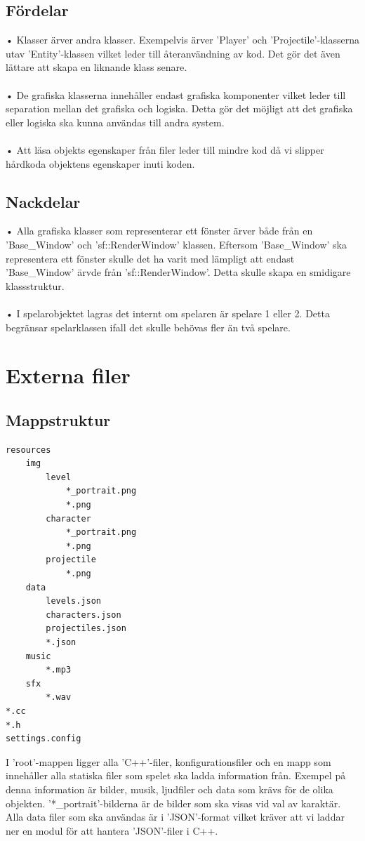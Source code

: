 \documentclass{TDP003mall}
\begin{document}
\subsection{Fördelar}
• Klasser ärver andra klasser. Exempelvis ärver 'Player' och 'Projectile'-klasserna utav 'Entity'-klassen vilket leder till återanvändning av kod. Det gör det även lättare att skapa en liknande klass senare.
\\ \\
• De grafiska klasserna innehåller endast grafiska komponenter vilket leder till separation mellan det grafiska och logiska. Detta gör det möjligt att det grafiska eller logiska ska kunna användas till andra system.
\\ \\
• Att läsa objekts egenskaper från filer leder till mindre kod då vi slipper hårdkoda objektens egenskaper inuti koden.
\subsection{Nackdelar}
• Alla grafiska klasser som representerar ett fönster ärver både från en 'Base\_Window' och 'sf::RenderWindow' klassen. Eftersom 'Base\_Window' ska representera ett fönster skulle det ha varit med lämpligt att endast 'Base\_Window' ärvde från 'sf::RenderWindow'. Detta skulle skapa en smidigare klassstruktur.
\\ \\
• I spelarobjektet lagras det internt om spelaren är spelare 1 eller 2. Detta begränsar spelarklassen ifall det skulle behövas fler än två spelare.

\newpage

\section{Externa filer}
\subsection{Mappstruktur}
\begin{lstlisting}[backgroundcolor = \color{lightgray}]
resources
    img
        level
            *_portrait.png
            *.png
        character
            *_portrait.png
            *.png
        projectile
            *.png
    data
        levels.json
        characters.json
        projectiles.json
        *.json
    music
        *.mp3
    sfx
        *.wav
*.cc
*.h
settings.config
\end{lstlisting}
I 'root'-mappen ligger alla 'C++'-filer, konfigurationsfiler och en mapp som innehåller alla statiska filer som spelet ska ladda information från. Exempel på denna information är bilder, musik, ljudfiler och data som krävs för de olika objekten. '*\_portrait'-bilderna är de bilder som ska visas vid val av karaktär. Alla data filer som ska användas är i 'JSON'-format vilket kräver att vi laddar ner en modul för att hantera 'JSON'-filer i C++.
\end{document}
